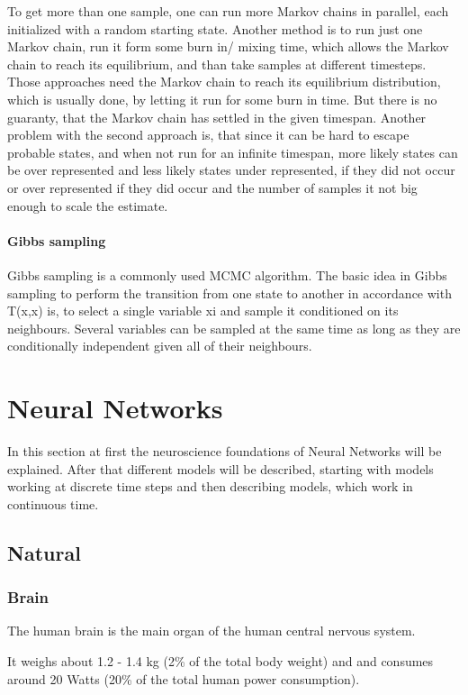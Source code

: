 To get more than one sample, one can run more Markov chains in parallel, each initialized with a random starting state. 
Another method is to run just one Markov chain, run it form some burn in/ mixing time, which allows the Markov chain to reach its equilibrium, and than take samples at different timesteps.
Those approaches need the Markov chain to reach its equilibrium distribution, which is usually done, by letting it run for some burn in time.
But there is no guaranty, that the Markov chain has settled in the given timespan.    
Another problem with the second approach is, that since it can be hard to escape probable states, and when not run for an infinite timespan, more likely states can be over represented and less likely states under represented, if they did not occur or over represented if they did occur and the number of samples it not big enough to scale the estimate.  

\paragraph{Gibbs sampling} Gibbs sampling is a commonly used MCMC algorithm. The basic idea in Gibbs sampling to perform the transition from one state to another in accordance with T(x,x) is, to select a single variable xi and sample it conditioned on its neighbours. 
Several variables can be sampled at the same time as long as they are conditionally independent given all of their neighbours.

\section{Neural Networks}

In this section at first the neuroscience foundations of Neural Networks will be explained.
After that different models will be described, starting with models working at discrete time steps and then describing models, which work in continuous time.

\subsection{Natural}
\subsubsection{Brain}

The human brain is the main organ of the human central nervous system.

It weighs about 1.2 - 1.4 kg (2\% of the total body weight) and and consumes around 20 Watts (20\% of the total human power consumption).

